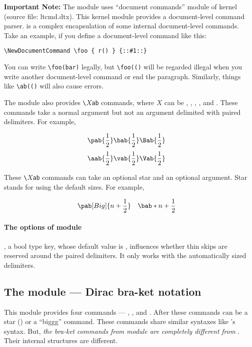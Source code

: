 \documentclass[11pt,letterpaper]{article}
\begin{document}
\pardanger
\textbf{Important Note:} The  module uses ``document commands''
module of \LaTeXe{} kernel (source file: ltcmd.dtx). This \LaTeXe{} kernel
module provides a document-level command parser.  is a complex
encapsulation of some internal document-level commands. Take an example,
if you define a document-level command like this:
\begin{Verbatim}
\NewDocumentCommand \foo { r() } {::#1::}
\end{Verbatim}
You can write \verb|\foo(bar)| legally, but \verb|\foo(()| will be regarded
illegal when you write another document-level command or end the paragraph.
Similarly, things like \verb|\ab(()| will also cause errors.

The  module also provides \texttt{\textbackslash}$X$\texttt{ab}
commands, where $X$ can be , , , ,  and
. These commands take a normal argument but not an argument delimited
with paired delimiters. For example,
\begin{example}
\def\0{\frac12}
\[ \pab{\0} \bab{\0} \Bab{\0} \]
\[ \aab{\0} \vab{\0} \Vab{\0} \]
\end{example}
These \texttt{\textbackslash$X$ab} commands can take an optional star and
an optional  argument. Star stands for using the default sizes.
For example,
\begin{example}
\def\0{n+\frac12}
\[ \pab[Big]{\0} \quad \bab*{\0} \]
\end{example}

\paragraph{The options of  module}
, a bool type key, whose default value is ,
influences whether thin skips are reserved around the paired delimiters.
It only works with the automatically sized delimiters.

\subsection{The  module --- Dirac bra-ket notation}
This module provides four commands --- , ,  and
. After these commands can be a star (\opt{*}) or a ``biggg''
command. These commands share similar syntaxes like 's syntax. But,
\emph{the bra-ket commands from  module are completely different
from }. Their internal structures are different.
\end{document}
